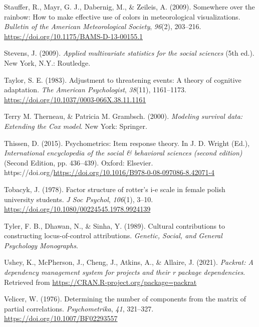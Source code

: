 \documentclass[
  english,
  man]{apa6}
\newlength{\cslhangindent}
\newlength{\cslentryspacingunit} %
\newenvironment{CSLReferences}[2] %
 {%
  \setlength{\parindent}{0pt}
  \ifodd #1
  \let\oldpar\par
  \def\par{\hangindent=\cslhangindent\oldpar}
  \fi
  \setlength{\parskip}{#2\cslentryspacingunit}
 }%
 {}
\begin{document}
\begin{CSLReferences}{1}{0}
\leavevmode{}%
Stauffer, R., Mayr, G. J., Dabernig, M., \& Zeileis, A. (2009). Somewhere over the rainbow: How to make effective use of colors in meteorological visualizations. \emph{Bulletin of the American Meteorological Society}, \emph{96}(2), 203--216. \url{https://doi.org/10.1175/BAMS-D-13-00155.1}

\leavevmode{}%
Stevens, J. (2009). \emph{Applied multivariate statistics for the social sciences} (5th ed.). New York, N.Y.: Routledge.

\leavevmode{}%
Taylor, S. E. (1983). Adjustment to threatening events: A theory of cognitive adaptation. \emph{The American Psychologist}, \emph{38}(11), 1161--1173. \url{https://doi.org/10.1037/0003-066X.38.11.1161}

\leavevmode{}%
Terry M. Therneau, \& Patricia M. Grambsch. (2000). \emph{Modeling survival data: Extending the {C}ox model}. New York: Springer.

\leavevmode{}%
Thissen, D. (2015). Psychometrics: Item response theory. In J. D. Wright (Ed.), \emph{International encyclopedia of the social \& behavioral sciences (second edition)} (Second Edition, pp. 436--439). Oxford: Elsevier. https://doi.org/\url{https://doi.org/10.1016/B978-0-08-097086-8.42071-4}

\leavevmode{}%
Tobacyk, J. (1978). Factor structure of rotter's i-e scale in female polish university students. \emph{J Soc Psychol}, \emph{106}(1), 3--10. \url{https://doi.org/10.1080/00224545.1978.9924139}

\leavevmode{}%
Tyler, F. B., Dhawan, N., \& Sinha, Y. (1989). Cultural contributions to constructing locus-of-control attributions. \emph{Genetic, Social, and General Psychology Monographs}.

\leavevmode{}%
Ushey, K., McPherson, J., Cheng, J., Atkins, A., \& Allaire, J. (2021). \emph{Packrat: A dependency management system for projects and their r package dependencies}. Retrieved from \url{https://CRAN.R-project.org/package=packrat}

\leavevmode{}%
Velicer, W. (1976). Determining the number of components from the matrix of partial correlations. \emph{Psychometrika}, \emph{41}, 321--327. \url{https://doi.org/10.1007/BF02293557}


\end{CSLReferences}
\end{document}
